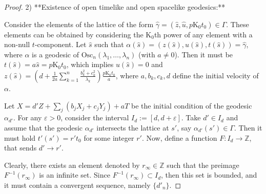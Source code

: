 \documentclass[12pt]{amsart}
\theoremstyle{plain}
\theoremstyle{definition}
\theoremstyle{remark}
\begin{document}
\begin{proof}
	2) **Existence of open timelike and open spacelike geodesics:**
	
	Consider the elements of the lattice of the form \( \hat{\gamma} = (\hat{z}, \hat{u}, p \mathrm{K_0} t_0) \in \Gamma \). These elements can be obtained by considering the \( \mathrm{K_0} \)th power of any element with a non-null \( t \)-component. Let \( \hat{s} \) such that \( \alpha(\hat{s}) = (z(\hat{s}), u(\hat{s}), t(\hat{s})) = \hat{\gamma} \), where \( \alpha \) is a geodesic of \( \text{Osc}_n(\lambda_1, \ldots, \lambda_n) \) (with \( a \neq 0 \)). Then it must be \( t(\hat{s}) = a \hat{s} = p \mathrm{K_0} t_0 \), which implies \( u(\hat{s}) = 0 \) and \( z(\hat{s}) = \left(d + \frac{1}{2a} \sum_{k=1}^{n} \frac{b_k^2 + c_k^2}{\lambda_k}\right) \frac{p \mathrm{K_0} t_0}{a} \), where \( a, b_k, c_k, d \) define the initial velocity of \( \alpha \).
	
	Let \( X = d' Z + \sum_j (b_j X_j + c_j Y_j) + a T \) be the initial condition of the geodesic \( \alpha_{d'} \). For any \( \varepsilon > 0 \), consider the interval \( I_d := [d, d + \varepsilon] \). Take \( d' \in I_d \) and assume that the geodesic \( \alpha_{d'} \) intersects the lattice at \( s' \), say \( \alpha_{d'}(s') \in \Gamma \). Then it must hold \( t'(s') = r' t_0 \) for some integer \( r' \). Now, define a function \( F: I_d \to \mathbb{Z} \), that sends \( d' \to r' \).
	
	Clearly, there exists an element denoted by \( r_{\infty} \in \mathbb{Z} \) such that the preimage \( F^{-1}(r_{\infty}) \) is an infinite set. Since \( F^{-1}(r_{\infty}) \subset I_d \), then this set is bounded, and it must contain a convergent sequence, namely \( \{d'_n\} \).
	

\end{proof}
\end{document}
